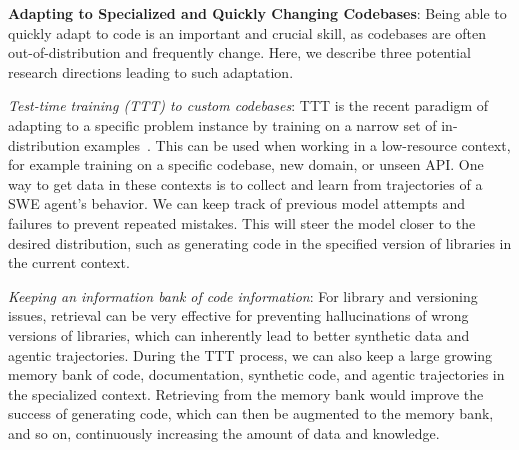 


\textbf{Adapting to Specialized and Quickly Changing Codebases}: Being able to quickly adapt to code is an important and crucial skill, as codebases are often out-of-distribution and frequently change. Here, we describe three potential research directions leading to such adaptation. 

\textit{Test-time training (TTT) to custom codebases}: TTT is the recent paradigm of adapting to a specific problem instance by training on a narrow set of in-distribution examples~\citep{akyurek2024surprisingeffectivenesstesttimetraining,sun19ttt}. This can be used when working in a low-resource context, for example training on a specific codebase, new domain, or unseen API. One way to get data in these contexts is to collect and learn from trajectories of a SWE agent's behavior. We can keep track of previous model attempts and failures to prevent repeated mistakes. This will steer the model closer to the desired distribution, such as generating code in the specified version of libraries in the current context.

\textit{Keeping an information bank of code information}: For library and versioning issues, retrieval can be very effective for preventing hallucinations of wrong versions of libraries, which can inherently lead to better synthetic data and agentic trajectories. During the TTT process, we can also keep a large growing memory bank of code, documentation, synthetic code, and agentic trajectories in the specialized context. Retrieving from the memory bank would improve the success of generating code, which can then be augmented to the memory bank, and so on, continuously increasing the amount of data and knowledge.

